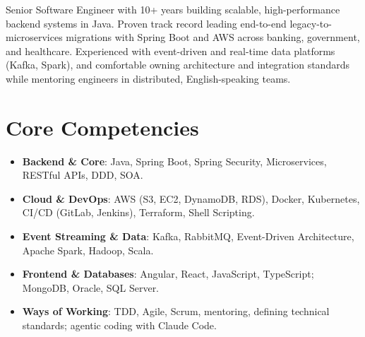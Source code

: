 \documentclass[11pt,a4paper,sans]{moderncv}
\begin{document}
\makecvtitle


\vspace{6pt}
\small{Senior Software Engineer with 10+ years building scalable, high-performance backend systems in Java. Proven track record leading end-to-end legacy-to-microservices migrations with Spring Boot and AWS across banking, government, and healthcare. Experienced with event-driven and real-time data platforms (Kafka, Spark), and comfortable owning architecture and integration standards while mentoring engineers in distributed, English-speaking teams.}


\section{Core Competencies}
\vspace{1pt}
\begin{itemize}

\item \textbf{Backend \& Core}: Java, Spring Boot, Spring Security, Microservices, RESTful APIs, DDD, SOA.

\item \textbf{Cloud \& DevOps}: AWS (S3, EC2, DynamoDB, RDS), Docker, Kubernetes, CI/CD (GitLab, Jenkins), Terraform, Shell Scripting.

\item \textbf{Event Streaming \& Data}: Kafka, RabbitMQ, Event-Driven Architecture, Apache Spark, Hadoop, Scala.

\item \textbf{Frontend \& Databases}: Angular, React, JavaScript, TypeScript; MongoDB, Oracle, SQL Server.

\item \textbf{Ways of Working}: TDD, Agile, Scrum, mentoring, defining technical standards; agentic coding with Claude Code.

\end{itemize}

\end{document}
